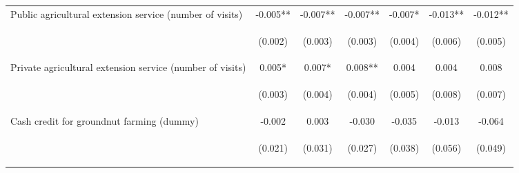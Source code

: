 \begin{center}
\begin{tabular}{lcccccc}
Public agricultural extension service (number of visits) & -0.005** & -0.007** & -0.007** & -0.007* & -0.013** & -0.012** \\
\vspace{4pt} & \begin{footnotesize}(0.002)\end{footnotesize} & \begin{footnotesize}(0.003)\end{footnotesize} & \begin{footnotesize}(0.003)\end{footnotesize} & \begin{footnotesize}(0.004)\end{footnotesize} & \begin{footnotesize}(0.006)\end{footnotesize} & \begin{footnotesize}(0.005)\end{footnotesize} \\
Private agricultural extension service (number of visits) & 0.005* & 0.007* & 0.008** & 0.004 & 0.004 & 0.008 \\
\vspace{4pt} & \begin{footnotesize}(0.003)\end{footnotesize} & \begin{footnotesize}(0.004)\end{footnotesize} & \begin{footnotesize}(0.004)\end{footnotesize} & \begin{footnotesize}(0.005)\end{footnotesize} & \begin{footnotesize}(0.008)\end{footnotesize} & \begin{footnotesize}(0.007)\end{footnotesize} \\
Cash credit for groundnut farming (dummy) & -0.002 & 0.003 & -0.030 & -0.035 & -0.013 & -0.064 \\
\vspace{4pt} & \begin{footnotesize}(0.021)\end{footnotesize} & \begin{footnotesize}(0.031)\end{footnotesize} & \begin{footnotesize}(0.027)\end{footnotesize} & \begin{footnotesize}(0.038)\end{footnotesize} & \begin{footnotesize}(0.056)\end{footnotesize} & \begin{footnotesize}(0.049)\end{footnotesize} \\

\end{tabular}
\end{center}
